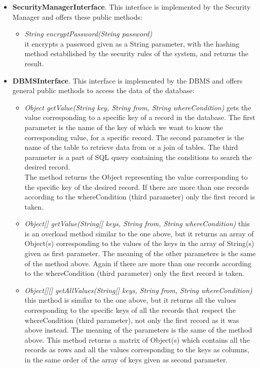\documentclass[\mainpath/main]{subfiles}
\begin{document}
\begin{itemize}
	\item \textbf{SecurityManagerInterface}. This interface is implemented by the Security Manager and offers these public methods:
	\begin{itemize}
		\item \textit{String encryptPassword(String password)}\\
		it encrypts a password given as a String parameter, with the hashing method estabilished by the security rules of the system, and returns the result.
	\end{itemize}	
	
	\item \textbf{DBMSInterface}. This interface is implemented by the DBMS and offers general public methods to access the data of the database:
	\begin{itemize}
		\item \textit{Object getValue(String key, String from, String whereCondition)}
		gets the value corresponding to a specific key of a record in the database. The first parameter is the name of the key of which we want to know the corresponding value, for a specific record. The second parameter is the name of the table to retrieve data from or a join of tables. The third parameter is a part of SQL query containing the conditions to search the desired record.\\
		The method returns the Object representing the value corresponding to the specific key of the desired record. If there are more than one records according to the whereCondition (third parameter) only the first record is taken.
		
		\item \textit{Object[] getValue(String[] keys, String from, String whereCondition)}
		this is an overload method similar to the one above, but it returns an array of Object(s) corresponding to the values of the keys in the array of String(s) given as first parameter. The meaning of the other parameters is the same of the method above. Again if there are more than one records according to the whereCondition (third parameter) only the first record is taken.
		
		\item \textit{Object[][] getAllValues(String[] keys, String from, String whereCondition)}
		this method is similar to the one above, but it returns all the values corresponding to the specific keys of all the records that respect the whereCondition (third parameter), not only the first record as it was above instead. The meaning of the parameters is the same of the method above. This method returns a matrix of Object(s) which contains all the records as rows and all the values corresponding to the keys as columns, in the same order of the array of keys given as second parameter.
		

\end{itemize}
\end{itemize}
\end{document}
